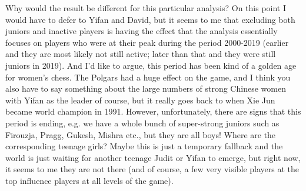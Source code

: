


Why would the result be different for this particular analysis? On this point I would have to defer to Yifan and David, but it seems to me that excluding both juniors and inactive players is having the effect that the analysis essentially focuses on players who were at their peak during the period 2000-2019 (earlier and they are most likely not still active; later than that and they were still juniors in 2019). And I'd like to argue, this period has been kind of a golden age for women's chess. The Polgars had a huge effect on the game, and I think you also have to say something about the large numbers of strong Chinese women with Yifan as the leader of course, but it really goes back to when Xie Jun became world champion in 1991. However, unfortunately, there are signs that this period is ending, e.g. we have a whole bunch of super-strong juniors such as Firouzja, Pragg, Gukesh, Mishra etc., but they are all boys! Where are the corresponding teenage girls? Maybe this is just a temporary fallback and the world is just waiting for another teenage Judit or Yifan to emerge, but right now, it seems to me they are not there (and of course, a few very visible players at the top influence players at all levels of the game).

